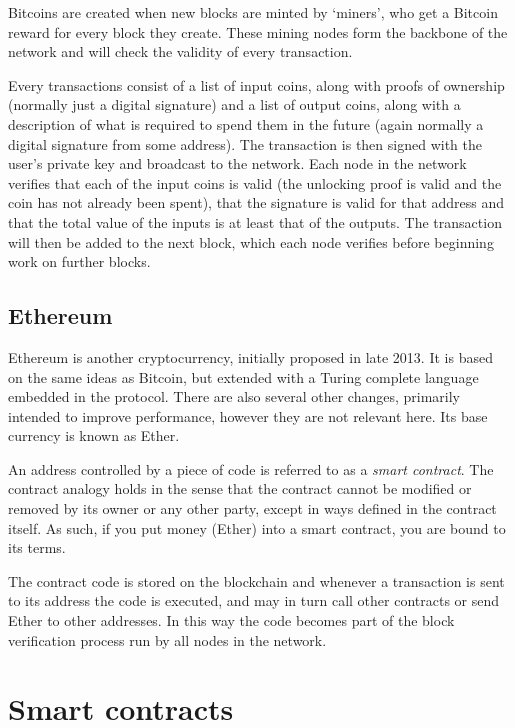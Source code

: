 \documentclass[12pt,a4paper,twoside,openright]{report}
\begin{document}
Bitcoins are created when new blocks are minted by `miners', who get a Bitcoin reward for every block they create.
These mining nodes form the backbone of the network and will check the validity of every transaction.

Every transactions consist of a list of input coins, along with proofs of ownership (normally just a digital signature)
and a list of output coins, along with a description of what is required to spend them in the future (again normally a digital signature from some address).
The transaction is then signed with the user's private key and broadcast to the network.
Each node in the network verifies that each of the input coins is valid (the unlocking proof is valid
and the coin has not already been spent), that the signature is valid for that address and that the total value of the inputs is at least that of the outputs.
The transaction will then be added to the next block, which each node verifies before beginning work on further blocks.


\subsection{Ethereum}


Ethereum is another cryptocurrency, initially proposed in late 2013\cite{eth-whitepaper}.
It is based on the same ideas as Bitcoin, but extended with a Turing complete language
embedded in the protocol.
There are also several other changes, primarily intended to improve performance, however they are not relevant here.
Its base currency is known as Ether.

An address controlled by a piece of code is referred to as a \textit{smart contract}.
The contract analogy holds in the sense that the contract cannot be modified or removed by
its owner or any other party, except in ways defined in the contract itself.
As such, if you put money (Ether) into a smart contract, you are bound to its terms.

The contract code is stored on the blockchain and whenever a transaction is sent to its address the code is executed,
and may in turn call other contracts or send Ether to other addresses.
In this way the code becomes part of the block verification process run by all nodes in the network.







\section{Smart contracts}
\end{document}
